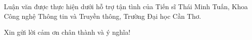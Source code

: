 \documentclass[./thesis.tex]{subfiles}
\begin{document}
{\fontsize{13}{12} \selectfont
Luận văn được thực hiện dưới hỗ trợ tận tình của Tiến sĩ Thái Minh Tuấn, Khoa Công nghệ Thông tin và Truyền thông, Trường Đại học Cần Thơ.}

{\fontsize{13}{12} \selectfont
Xin gửi lời cảm ơn chân thành và ý nghĩa!}
\end{document}

